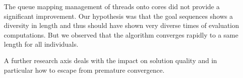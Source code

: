 \documentclass{sig-alternate}
\begin{document}
The queue mapping management of threads onto cores did not provide a significant improvement. Our hypothesis was that the goal sequences shows a diversity in length and thus should have shown very diverse times of evaluation computations. But we observed that the algorithm converges rapidly to a same length for all individuals.


A further research axis deals with the impact on solution quality and in particular how to escape from premature convergence.








%

%
%
\end{document}
